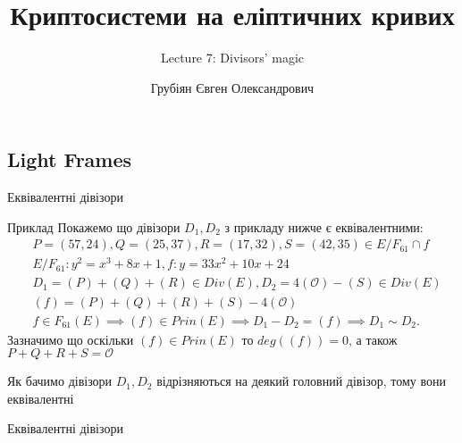 \documentclass[9pt]{beamer}
\title{Криптосистеми на еліптичних кривих} %
\subtitle{Lecture 7: Divisors' magic}
\author{Грубіян Євген Олександрович}
\begin{document}
  \frame{\maketitle}


  \begin{darkframes}
      
    \section{Light Frames}
\begin{frame}{Еквівалентні дівізори}

\begin{exampleblock}{Приклад}
Покажемо що дівізори $D_1, D_2$ з прикладу нижче є еквівалентними:
\begin{align*}
    & P = (57, 24), Q = (25, 37), R = (17, 32), S = (42, 35) \in E/F_{61} \cap f \\
    & E/F_{61}: y^2 = x^3 + 8x + 1, f : y = 33x^2 + 10x + 24 \\
    & D_1 = (P ) + (Q) + (R) \in Div(E), D_2 = 4(\mathcal{O}) - (S) \in Div(E) \\
    & (f ) = (P ) + (Q) + (R) + (S) - 4(\mathcal{O}) \\
    &f \in F_{61}(E) \implies (f) \in Prin(E) \implies D_1 - D_2 = (f) \implies D_1 \sim D_2.
\end{align*}
Зазначимо що оскільки $(f) \in Prin(E)$ то $deg((f))=0$, а також $P+Q+R+S=\mathcal{O}$

Як бачимо дівізори $D_1,D_2$ відрізняються на деякий головний дівізор, тому вони еквівалентні
\end{exampleblock}
     
\end{frame}

\begin{frame}{Еквівалентні дівізори}

\begin{figure}
\centering
{}
\end{figure}
\end{frame}
\end{darkframes}
\end{document}
